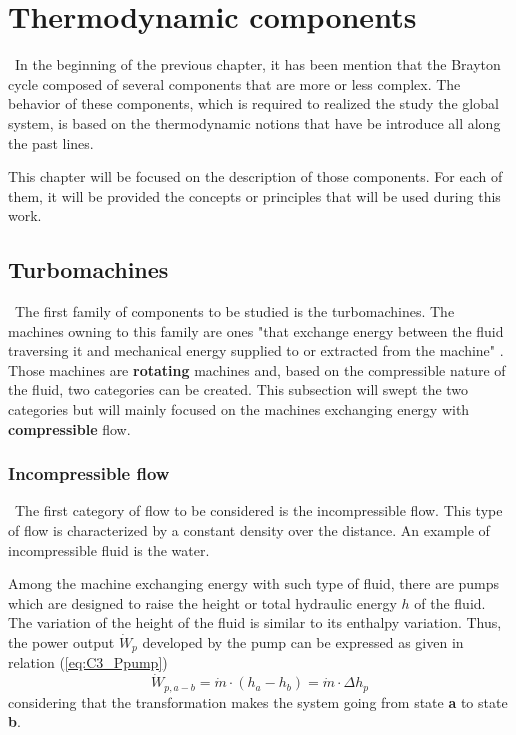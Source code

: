 \graphicspath{{Chapter_3_-_Thermodynamic_components/Images/}}
\chapter{Thermodynamic components}
\quad\, In the beginning of the previous chapter, it has been mention that the Brayton cycle composed of several components that are more or less complex. The behavior of these components, which is required to realized the study the global system, is based on the thermodynamic notions that have be introduce all along the past lines.

This chapter will be focused on the description of those components. For each of them, it will be provided the concepts or principles that will be used during this work. 
\section{Turbomachines}
\quad\, The first family of components to be studied is the turbomachines. The machines owning to this family are ones "that exchange energy between the
fluid traversing it and mechanical energy supplied to or extracted from the machine" \cite{Hillewaert2019}. Those machines are \textbf{rotating} machines and, based on the compressible nature of the fluid, two categories can be created.
This subsection will swept the two categories but will mainly focused on the machines exchanging energy with \textbf{compressible} flow.

\subsection{Incompressible flow}
\quad\, The first category of flow to be considered is the incompressible flow. This type of flow is characterized by a constant density over the distance. An example of incompressible fluid is the water.

Among the machine exchanging energy with such type of fluid, there are pumps which are designed to raise the height or total hydraulic energy $h$ of the fluid. The variation of the height of the fluid is similar to its enthalpy variation. Thus, the power output  $\dot{W}_p$ developed by the pump can be expressed as given in relation (\ref{eq:C3_Ppump})
\begin{equation}
\dot{W}_{p,a-b} = \dot{m}\cdot (h_a - h_b)=\dot{m}\cdot\Delta h_p \label{eq:C3_Ppump}
\end{equation}
considering that the transformation makes the system going from state \textbf{a} to state \textbf{b}.

